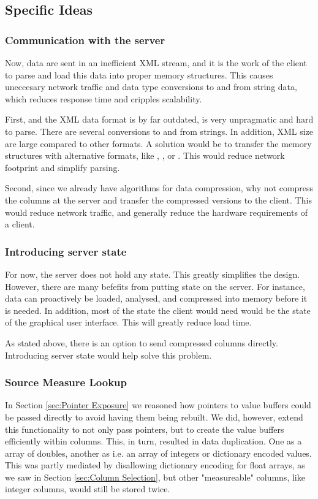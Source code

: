 \subsection{Specific Ideas}
\label{sub:Specific Ideas}


\subsubsection{Communication with the server}
\label{sub:Compressing data at the server}
Now, data are sent in an inefficient XML stream, and it is the work of the client to parse and load this data into proper memory structures. This causes uneccesary network traffic and data type conversions to and from string data, which reduces response time and cripples scalability.

First, and the XML data format is by far outdated, is very unpragmatic and hard to parse. There are several conversions to and from strings. In addition, XML size are large compared to other formats. A solution would be to transfer the memory structures with alternative formats, like , , or . This would reduce network footprint and simplify parsing. 

Second, since we already have algorithms for data compression, why not compress the columns at the server and transfer the compressed versions to the client. This would reduce network traffic, and generally reduce the hardware requirements of a client.

\subsubsection{Introducing server state}
\label{sub:Introducing server state}
For now, the server does not hold any state. This greatly simplifies the design. However, there are many befefits from putting state on the server. For instance, data can proactively be loaded, analysed, and compressed into memory before it is needed. In addition, most of the state the client would need would be the state of the graphical user interface. This will greatly reduce load time. 

As stated above, there is an option to send compressed columns directly. Introducing server state would help solve this problem.

\subsubsection{Source Measure Lookup}
\label{sub:Source Measure Lookup}
In Section \ref{sec:Pointer Exposure} we reasoned how pointers to value buffers could be passed directly to avoid having them being rebuilt. We did, however, extend this functionality to not only pass pointers, but to create the value buffers efficiently within columns. This, in turn, resulted in data duplication. One as a array of doubles, another as i.e. an array of integers or dictionary encoded values. This was partly mediated by disallowing dictionary encoding for float arrays, as we saw in Section \ref{sec:Column Selection}, but other "measureable" columns, like integer columns, would still be stored twice.

